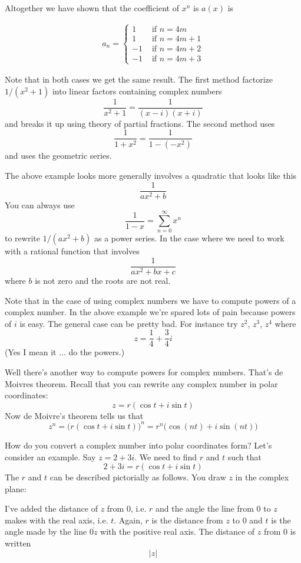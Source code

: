 Altogether we have shown that the coefficient of $x^n$ is $a(x)$ is

\begin{align*}
a_n =
\begin{cases}
1 & \text{ if } n = 4m \\
1 & \text{ if } n = 4m + 1 \\
-1 & \text{ if } n = 4m + 2 \\
-1 & \text{ if } n = 4m + 3
\end{cases}
\end{align*}

Note that in both cases we get the same result.
The first method factorize $1/(x^2+1)$ into linear factors containing
complex numbers 
\[
\frac{1}{x^2 + 1} = \frac{1}{(x - i)(x + i)}
\]
and breaks it up using theory of partial fractions.
The second method uses
\[
\frac{1}{1+x^2} = \frac{1}{1 - (-x^2)}
\]
and uses the geometric series.

The above example looks more generally involves a quadratic that looks 
like this
\[
\frac{1}{ax^2 + b}
\]
You can always use 
\[
\frac{1}{1 - x} = \sum_{n=0}^\infty x^n
\]
to rewrite $1/(ax^2 + b)$ as a power series.
In the case where we need to work with a rational function that involves
\[
\frac{1}{ax^2 + bx + c}
\]
where $b$ is not zero and the roots are not real.

Note that in the case of using complex numbers we have to compute
powers of a complex number.
In the above example we're spared lots of pain because powers of $i$ is 
easy.
The general case can be pretty bad. 
For instance try $z^2$, $z^3$, $z^4$ where 
\[
z = \frac{1}{4} + \frac{3}{4}i
\]
(Yes I mean it ... do the powers.)

Well there's another way to compute powers for complex numbers.
That's de Moivres theorem.
Recall that you can rewrite any complex number in polar coordinates:
\[
z = r(\cos t + i \sin t)
\]
Now de Moivre's theorem tells us that
\[
z^n = \biggl( r(\cos t + i \sin t) \biggr)^n
= r^n \bigl( \cos(nt) + i \sin(nt) \bigr)
\]

How do you convert a complex number into polar coordinates form?
Let's consider an example. 
Say $z = 2 + 3i$. 
We need to find $r$ and $t$ such that
\[
2 + 3i = r(\cos t + i \sin t)
\]
The $r$ and $t$ can be described pictorially as follows.
You draw $z$ in the complex plane:

I've added the distance of $z$ from 0, i.e. $r$ and the
angle the line from $0$ to $z$ makes with the real axis, i.e. $t$.
Again, $r$ is the distance from $z$ to $0$ and $t$ is the 
angle made by the line $\overline{0z}$ with the positive real axis.
The distance of $z$ from $0$ is written
\[
|z|
\]

